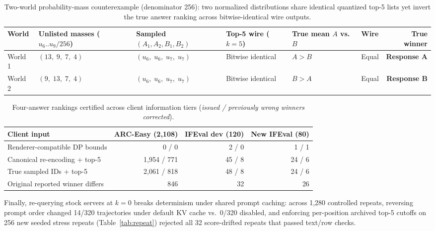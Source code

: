 \documentclass[11pt,letterpaper]{article}
\begin{document}
\begin{table}[t]
\centering
\setlength{\tabcolsep}{2.8pt}
\caption{Two-world probability-mass counterexample (denominator 256): two normalized distributions share identical quantized top-5 lists yet invert the true answer ranking across bitwise-identical wire outputs.}
\label{tab:counterexample}
\scriptsize
\begin{tabular}{@{}llllllr@{}}\toprule
World & Unlisted masses ($u_6..u_9 / 256$) & Sampled $(A_1,A_2,B_1,B_2)$ & Top-5 wire ($k{=}5$) & True mean $A$ vs.\ $B$ & Wire & True winner\\\midrule
World 1 & $(13,\; 9,\; 7,\; 4)$ & $(u_6,\; u_6,\; u_7,\; u_7)$ & Bitwise identical & $A > B$ & Equal & \textbf{Response A}\\
World 2 & $(9,\; 13,\; 7,\; 4)$ & $(u_6,\; u_6,\; u_7,\; u_7)$ & Bitwise identical & $B > A$ & Equal & \textbf{Response B}\\\bottomrule
\end{tabular}
\end{table}

\begin{table}[t]
\centering
\caption{Four-answer rankings certified across client information tiers (\emph{issued / previously wrong winners corrected}).}
\label{tab:recovery}
\footnotesize
\begin{tabular}{@{}lrrr@{}}\toprule
Client input & ARC-Easy (2,108) & IFEval dev (120) & New IFEval (80)\\\midrule
Renderer-compatible DP bounds & 0 / 0 & 2 / 0 & 1 / 1\\
Canonical re-encoding + top-5 & 1,954 / 771 & 45 / 8 & 24 / 6\\
True sampled IDs + top-5 & 2,061 / 818 & 48 / 8 & 24 / 6\\
Original reported winner differs & 846 & 32 & 26\\\bottomrule
\end{tabular}
\end{table}

Finally, re-querying stock servers at $k=0$ breaks determinism under shared prompt caching: across 1,280 controlled repeats, reversing prompt order changed 14/320 trajectories under default KV cache vs.\ 0/320 disabled, and enforcing per-position archived top-5 cutoffs on 256 new seeded stress repeats (Table~\ref{tab:repeat}) rejected all 32 score-drifted repeats that passed text/row checks.
\end{document}
